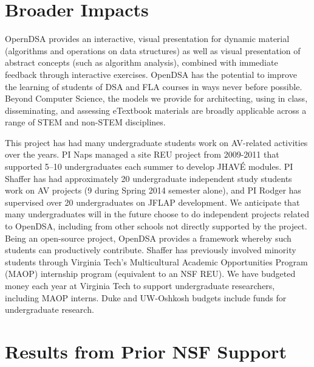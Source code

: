 \documentclass[11pt]{article}
\begin{document}
\section{Broader Impacts}

OpernDSA provides an interactive, visual presentation for dynamic
material (algorithms and operations on data structures) as well as
visual presentation of abstract concepts (such as algorithm analysis),
combined with immediate feedback through interactive exercises.
OpenDSA has the potential to improve the learning of students of DSA
and FLA courses in ways never before possible.
Beyond Computer Science, the models we provide for architecting,
using in class, disseminating, and assessing eTextbook materials are
broadly applicable across a range of STEM and non-STEM disciplines.

This project has had many undergraduate students work on AV-related
activities over the years.
PI Naps managed a site REU project from 2009-2011 that supported
5--10 undergraduates each summer to develop JHAV\'{E} modules.
PI Shaffer has had approximately 20 undergraduate independent study
students work on AV projects (9 during Spring 2014 semester alone),
and PI Rodger has supervised over 20 undergraduates on JFLAP
development.
We anticipate that many undergraduates will in the future choose to do
independent projects related to OpenDSA, including from other schools
not directly supported by the project.
Being an open-source project, OpenDSA provides a framework whereby
such students can productively contribute.
Shaffer has previously involved minority students through Virginia
Tech's Multicultural Academic Opportunities Program (MAOP) internship
program (equivalent to an NSF REU).
We have budgeted money each year at Virginia Tech to
support undergraduate researchers, including MAOP interns.
Duke and UW-Oshkosh budgets include funds for undergraduate research.


\section{Results from Prior NSF Support}
\end{document}
